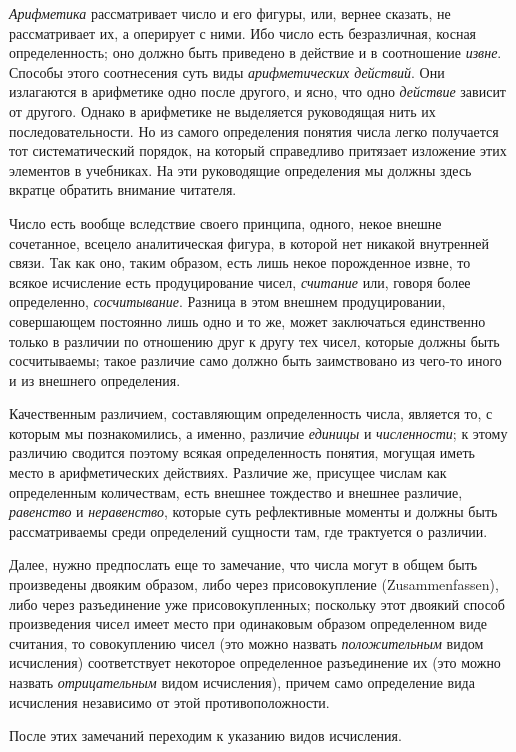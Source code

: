 {\em Арифметика} рассматривает число и его фигуры, или,
вернее сказать, не рассматривает их, а оперирует с ними. Ибо число есть
безразличная, косная определенность; оно должно быть приведено в действие и
в соотношение {\em извне}. Способы этого соотнесения
суть виды {\em арифметических действий}. Они излагаются
в арифметике одно после другого, и ясно, что одно
{\em действие} зависит от другого. Однако в арифметике
не выделяется руководящая нить их последовательности. Но из самого
определения понятия числа легко получается тот систематический порядок, на
который справедливо притязает изложение этих элементов в учебниках. На эти
руководящие определения мы должны здесь вкратце обратить внимание читателя.

Число есть вообще вследствие своего принципа, одного, некое внешне
сочетанное, всецело аналитическая фигура, в которой нет никакой внутренней
связи. Так как оно, таким образом, есть лишь некое порожденное извне, то
всякое исчисление есть продуцирование чисел,
{\em считание} или, говоря более определенно,
{\em сосчитывание}. Разница в этом внешнем
продуцировании, совершающем постоянно лишь одно и то же, может заключаться
единственно только в различии по отношению друг к другу тех чисел, которые
должны быть сосчитываемы; такое различие само должно быть заимствовано из
чего-то иного и из внешнего определения.

Качественным различием, составляющим определенность числа, является то, с
которым мы познакомились, а именно, различие
{\em единицы} и {\em численности};
к этому различию сводится поэтому всякая определенность понятия, могущая
иметь место в арифметических действиях. Различие же, присущее числам как
определенным количествам, есть внешнее тождество и внешнее различие,
{\em равенство} и
{\em неравенство}, которые суть рефлективные моменты и
должны быть рассматриваемы среди определений сущности там, где трактуется о
различии.

Далее, нужно предпослать еще то замечание, что числа могут в общем быть
произведены двояким образом, либо через присовокупление (Zusammenfassen),
либо через разъединение уже присовокупленных; поскольку этот двоякий способ
произведения чисел имеет место при одинаковым образом определенном виде
считания, то совокуплению чисел (это можно назвать
{\em положительным} видом исчисления) соответствует
некоторое определенное разъединение их (это можно назвать
{\em отрицательным} видом исчисления), причем само
определение вида исчисления независимо от этой противоположности.

После этих замечаний переходим к указанию видов исчисления.

